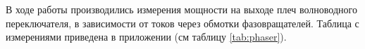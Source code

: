
В ходе работы производились измерения мощности на выходе плеч волноводного переключателя, в зависимости от
токов через обмотки фазовращателей. Таблица с измерениями приведена в приложении (см таблицу \ref{tab:phaser}).

